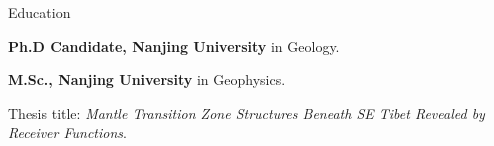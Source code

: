 \begin{rubric}{Education}

\entry*[2018 -- Present]%
	\textbf{Ph.D Candidate, Nanjing University} in Geology.

\entry*[2013 -- 2016]%
	\textbf{M.Sc., Nanjing University} in Geophysics. \par
	\par Thesis title: \emph{Mantle Transition Zone Structures Beneath SE Tibet Revealed by Receiver Functions}.
\end{rubric}